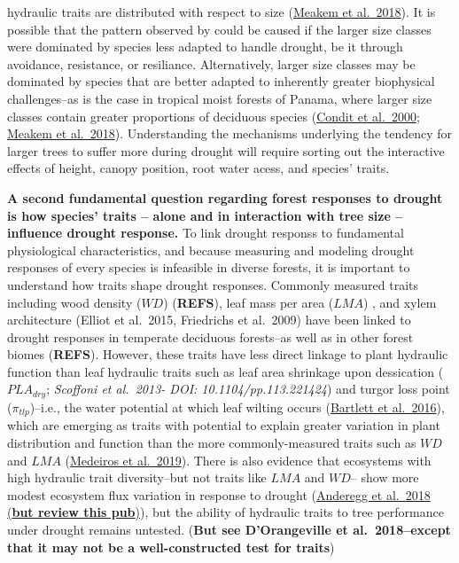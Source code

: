 \documentclass[]{article}
\begin{document}
hydraulic traits are distributed with respect to size
(\href{https://nph.onlinelibrary.wiley.com/doi/10.1111/nph.14633}{Meakem
et al.~2018}). It is possible that the pattern observed by
\citet{bennett_larger_2015} could be caused if the larger size classes
were dominated by species less adapted to handle drought, be it through
avoidance, resistance, or resiliance. Alternatively, larger size classes
may be dominated by species that are better adapted to inherently
greater biophysical challenges--as is the case in tropical moist forests
of Panama, where larger size classes contain greater proportions of
deciduous species
(\href{https://doi-org.smithsonian.idm.oclc.org/10.2307/3236572}{Condit
et al.~2000};
\href{https://nph.onlinelibrary.wiley.com/doi/10.1111/nph.14633}{Meakem
et al.~2018}). Understanding the mechanisms underlying the tendency for
larger trees to suffer more during drought will require sorting out the
interactive effects of height, canopy position, root water acess, and
species' traits.

\textbf{A second fundamental question regarding forest responses to
drought is how species' traits -- alone and in interaction with tree
size -- influence drought response.} To link drought responss to
fundamental physiological characteristics, and because measuring and
modeling drought responses of every species is infeasible in diverse
forests, it is important to understand how traits shape drought
responses. Commonly measured traits including wood density (\(WD\))
(\textbf{REFS}), leaf mass per area (\(LMA\))
\citep{abrams_adaptations_1990, guerfel_impacts_2009}, and xylem
architecture \citep{kannenberg_linking_2019}(Elliot et al.~2015,
Friedrichs et al.~2009) have been linked to drought responses in
temperate deciduous forests--as well as in other forest biomes
(\textbf{REFS}). However, these traits have less direct linkage to plant
hydraulic function than leaf hydraulic traits such as leaf area
shrinkage upon dessication (\(PLA_{dry}\); \emph{Scoffoni et al.~2013-
DOI: 10.1104/pp.113.221424}) and turgor loss point
(\(\pi_{tlp}\))--i.e., the water potential at which leaf wilting occurs
(\href{https://www.pnas.org/content/113/46/13098.short}{Bartlett et
al.~2016}), which are emerging as traits with potential to explain
greater variation in plant distribution and function than the more
commonly-measured traits such as \(WD\) and \(LMA\)
(\href{https://besjournals.onlinelibrary.wiley.com/doi/abs/10.1111/1365-2435.13229}{Medeiros
et al.~2019}). There is also evidence that ecosystems with high
hydraulic trait diversity--but not traits like \(LMA\) and \(WD\)-- show
more modest ecosystem flux variation in response to drought
(\href{https://doi.org/10.1038/s41586-018-0539-7}{Anderegg et al.~2018
(\textbf{but review this pub})}), but the ability of hydraulic traits to
tree performance under drought remains untested. (\textbf{But see
D'Orangeville et al.~2018--except that it may not be a well-constructed
test for traits})
\end{document}
